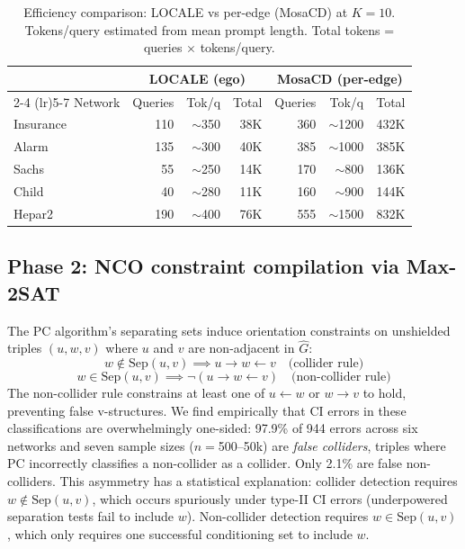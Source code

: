 \documentclass{article}
\begin{document}
\begin{table}[t]
\centering
\caption{Efficiency comparison: LOCALE vs per-edge (MosaCD) at $K{=}10$. Tokens/query estimated from mean prompt length. Total tokens = queries $\times$ tokens/query.}
\label{tab:efficiency}
\small
\begin{tabular}{lrrrrrr}
\toprule
 & \multicolumn{3}{c}{LOCALE (ego)} & \multicolumn{3}{c}{MosaCD (per-edge)} \\
\cmidrule(lr){2-4} \cmidrule(lr){5-7}
Network & Queries & Tok/q & Total & Queries & Tok/q & Total \\
\midrule
Insurance & 110 & $\sim$350 & 38K & 360 & $\sim$1200 & 432K \\
Alarm     & 135 & $\sim$300 & 40K & 385 & $\sim$1000 & 385K \\
Sachs     & 55  & $\sim$250 & 14K & 170 & $\sim$800  & 136K \\
Child     & 40  & $\sim$280 & 11K & 160 & $\sim$900  & 144K \\
Hepar2    & 190 & $\sim$400 & 76K & 555 & $\sim$1500 & 832K \\
\bottomrule
\end{tabular}
\end{table}

\subsection{Phase 2: NCO constraint compilation via Max-2SAT}

The PC algorithm's separating sets induce orientation constraints on unshielded triples $(u, w, v)$ where $u$ and $v$ are non-adjacent in $\hat{G}$:
\begin{equation}
    w \notin \text{Sep}(u, v) \implies u \to w \leftarrow v \quad \text{(collider rule)}
\end{equation}
\begin{equation}
    w \in \text{Sep}(u, v) \implies \neg(u \to w \leftarrow v) \quad \text{(non-collider rule)}
\end{equation}
The non-collider rule constrains at least one of $u \leftarrow w$ or $w \to v$ to hold, preventing false v-structures. We find empirically that CI errors in these classifications are overwhelmingly one-sided: 97.9\% of 944 errors across six networks and seven sample sizes ($n{=}$500--50k) are \textit{false colliders}, triples where PC incorrectly classifies a non-collider as a collider. Only 2.1\% are false non-colliders. This asymmetry has a statistical explanation: collider detection requires $w \notin \text{Sep}(u,v)$, which occurs spuriously under type-II CI errors (underpowered separation tests fail to include $w$). Non-collider detection requires $w \in \text{Sep}(u,v)$, which only requires one successful conditioning set to include $w$.
\end{document}
